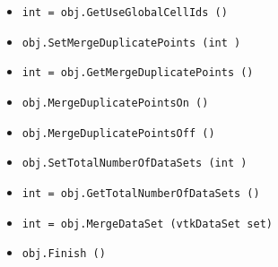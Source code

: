 \begin{itemize}
\item  \verb|int = obj.GetUseGlobalCellIds ()|

\item  \verb|obj.SetMergeDuplicatePoints (int )|

\item  \verb|int = obj.GetMergeDuplicatePoints ()|

\item  \verb|obj.MergeDuplicatePointsOn ()|

\item  \verb|obj.MergeDuplicatePointsOff ()|

\item  \verb|obj.SetTotalNumberOfDataSets (int )|

\item  \verb|int = obj.GetTotalNumberOfDataSets ()|

\item  \verb|int = obj.MergeDataSet (vtkDataSet set)|

\item  \verb|obj.Finish ()|

\end{itemize}
